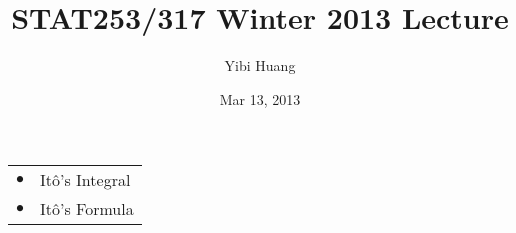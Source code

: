 \documentclass[letterpaper,handout]{beamer}
\title{STAT253/317 Winter 2013 Lecture \chapnum} \date{Mar 13, 2013} \author{Yibi Huang}
\def\E{\mathbb E}
\def\F{\mathcal{F}}
\begin{document}
\begin{frame}\maketitle
\bigskip
\begin{center}\large
\begin{tabular}{ll}
$\bullet$ & It\^{o}'s Integral\\
$\bullet$ & It\^{o}'s Formula\\
\end{tabular}
\end{center}
\end{frame}
%
\end{document}
